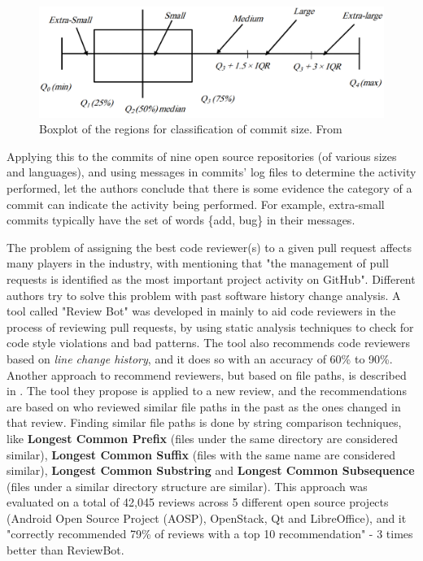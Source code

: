 \begin{figure}[h]
    \centering
    \includegraphics[scale=0.2]{imgs/boxplot-commit-size.png}
    \caption{Boxplot of the regions for classification of commit size. From \cite{Alali_2008}}
    \label{fig:boxplot-commit-size}
\end{figure}

Applying this to the commits of nine open source repositories (of various sizes and languages), and using messages in commits' log files to determine the activity performed, let the authors conclude that there is some evidence the category of a commit can indicate the activity being performed. For example, extra-small commits typically have the set of words \{add, bug\} in their messages.

The problem of assigning the best code reviewer(s) to a given pull request affects many players in the industry, with \cite{Yu_2016} mentioning that "the management of pull requests is identified as the most important project activity on GitHub". Different authors try to solve this problem with past software history change analysis. A tool called "Review Bot" was developed in \cite{Balachandran_2013} mainly to aid code reviewers in the process of reviewing pull requests, by using static analysis techniques to check for code style violations and bad patterns. The tool also recommends code reviewers based on \textit{line change history}, and it does so with an accuracy of 60\% to 90\%. Another approach to recommend reviewers, but based on file paths, is described in \cite{Thongtanunam_2015}. The tool they propose is applied to a new review, and the recommendations are based on who reviewed similar file paths in the past as the ones changed in that review. Finding similar file paths is done by string comparison techniques, like \textbf{Longest Common Prefix} (files under the same directory are considered similar), \textbf{Longest Common Suffix} (files with the same name are considered similar), \textbf{Longest Common Substring} and \textbf{Longest Common Subsequence} (files under a similar directory structure are similar). This approach was evaluated on a total of 42,045 reviews across 5 different open source projects (Android Open Source Project (AOSP), OpenStack, Qt and LibreOffice), and it "correctly
recommended 79\% of reviews with a top 10 recommendation" - 3 times better than ReviewBot.


